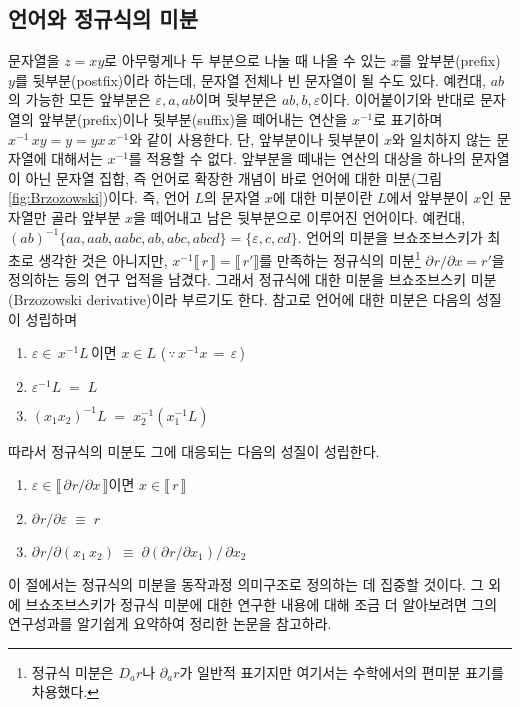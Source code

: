 \subsection{언어와 정규식의 미분}
문자열을 $z=xy$로 아무렇게나 두 부분으로 나눌 때 나올 수 있는
$x$를 앞부분(prefix) $y$를 뒷부분(postfix)이라 하는데,
문자열 전체나 빈 문자열이 될 수도 있다. 예컨대, $ab$의 가능한 모든
앞부분은 $\varepsilon,a,ab$이며 뒷부분은 $ab,b,\varepsilon$이다.
이어붙이기와 반대로 문자열의 앞부분(prefix)이나 뒷부분(suffix)을
떼어내는 연산을 $x^{-1}$로 표기하며 $x^{-1}\,xy = y = yx\,x^{-1}$와
같이 사용한다. 단, 앞부분이나 뒷부분이 $x$와 일치하지 않는 문자열에
대해서는 $x^{-1}$를 적용할 수 없다. 앞부분을 떼내는 연산의 대상을
하나의 문자열이 아닌 문자열 집합, 즉 언어로 확장한 개념이 바로 언어에
대한 미분(그림\;\ref{fig:Brzozowski})이다.
즉, 언어 $L$의 문자열 $x$에 대한 미분이란 $L$에서 앞부분이 $x$인
문자열만 골라 앞부분 $x$을 떼어내고 남은 뒷부분으로 이루어진 언어이다.
예컨대, $(ab)^{-1} \{aa,aab,aabc,ab,abc,abcd\} = \{\varepsilon, c, cd\}$.
언어의 미분을 브쇼조브스키가 최초로 생각한 것은 아니지만,
$x^{-1} \llbracket\,r\,\rrbracket = \llbracket\,r' \rrbracket$를
만족하는 정규식의 미분\footnote{정규식 미분은 $D_a r$나
    $\partial_a r$가 일반적 표기지만
    여기서는 수학에서의 편미분 표기를 차용했다.}
$\partial_{}r/\partial x = r'$을
정의하는 등의 연구 업적을 남겼다. 그래서 정규식에 대한 미분을
브쇼조브스키 미분(Brzozowski derivative)이라 부르기도 한다.
참고로 언어에 대한 미분은 다음의 성질이 성립하며
\begin{enumerate}\tightlist
 \item $\varepsilon \in\,x^{-1} L$\,이면 $x\in L$
      ($\,\because\, x^{-1}x \,=\, \varepsilon\,$)
 \item $\varepsilon^{-1} L \;=\; L$
 \item $(x_1x_2)^{-1} L \;=\; x_2^{-1}(x_1^{-1} L)$
\end{enumerate}
따라서 정규식의 미분도 그에 대응되는 다음의 성질이 성립한다.
\begin{enumerate}\tightlist
 \item $\varepsilon \in \llbracket\,\partial_{}r/\partial x\,\rrbracket$이면
       $x\in \llbracket\,r\,\rrbracket$
 \item $\partial_{}r/\partial\varepsilon \;\equiv\; r$
 \item $\partial_{}r/\partial(x_1\,x_2) \;\equiv\;
        \partial(\partial_{}r/\partial x_1)/\,\partial x_2$
\end{enumerate}
이 절에서는 정규식의 미분을 동작과정 의미구조로 정의하는 데
집중할 것이다. 그 외에 브쇼조브스키가 정규식 미분에 대한
연구한 내용에 대해 조금 더 알아보려면 그의 연구성과\cite{Brzozowski64}를
알기쉽게 요약하여 정리한 논문\cite{Owens09REderivRE}을 참고하라.

